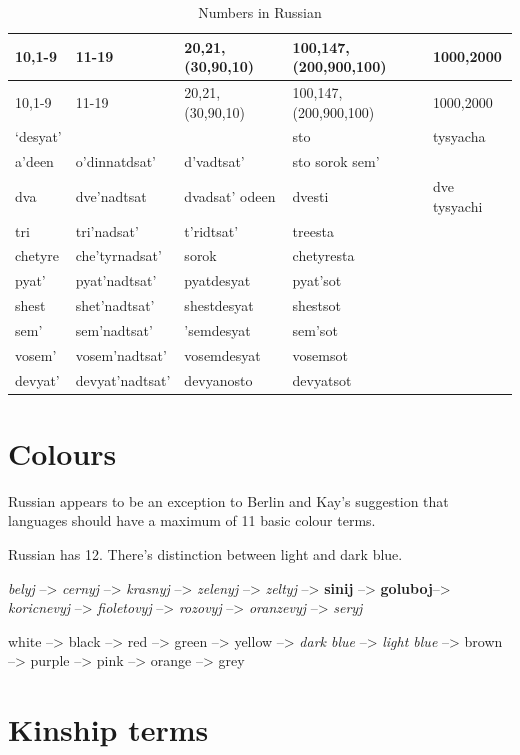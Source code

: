 \documentclass[
  a4paperpaper,
]{report}
\begin{document}
\begin{longtable}[]{@{}lllll@{}}
\caption{Numbers in Russian}\tabularnewline
\toprule
10,1-9 & 11-19 & 20,21,(30,90,10) & 100,147, (200,900,100) &
1000,2000\tabularnewline
\midrule
\endfirsthead
\toprule
10,1-9 & 11-19 & 20,21,(30,90,10) & 100,147, (200,900,100) &
1000,2000\tabularnewline
\midrule
\endhead
`desyat' & & & sto & tysyacha\tabularnewline
a'deen & o'dinnatdsat' & d'vadtsat' & sto sorok sem' &\tabularnewline
dva & dve'nadtsat & dvadsat' odeen & dvesti & dve
tysyachi\tabularnewline
tri & tri'nadsat' & t'ridtsat' & treesta &\tabularnewline
chetyre & che'tyrnadsat' & sorok & chetyresta &\tabularnewline
pyat' & pyat'nadtsat' & pyatdesyat & pyat'sot &\tabularnewline
shest & shet'nadtsat' & shestdesyat & shestsot &\tabularnewline
sem' & sem'nadtsat' & 'semdesyat & sem'sot &\tabularnewline
vosem' & vosem'nadtsat' & vosemdesyat & vosemsot &\tabularnewline
devyat' & devyat'nadtsat' & devyanosto & devyatsot &\tabularnewline
\bottomrule
\end{longtable}

\hypertarget{colours}{%
\section{Colours}\label{colours}}

Russian appears to be an exception to Berlin and Kay's suggestion that
languages should have a maximum of 11 basic colour terms.

Russian has 12. There's distinction between light and dark blue.

\emph{belyj} --\textgreater{} \emph{cernyj} --\textgreater{}
\emph{krasnyj} --\textgreater{} \emph{zelenyj} --\textgreater{}
\emph{zeltyj} --\textgreater{} \textbf{sinij} --\textgreater{}
\textbf{goluboj}--\textgreater{} \emph{koricnevyj} --\textgreater{}
\emph{fioletovyj} --\textgreater{} \emph{rozovyj} --\textgreater{}
\emph{oranzevyj} --\textgreater{} \emph{seryj}

white --\textgreater{} black --\textgreater{} red --\textgreater{} green
--\textgreater{} yellow --\textgreater{} \emph{dark blue}
--\textgreater{} \emph{light blue} --\textgreater{} brown
--\textgreater{} purple --\textgreater{} pink --\textgreater{} orange
--\textgreater{} grey

\hypertarget{kinship-terms}{%
\section{Kinship terms}\label{kinship-terms}}
\end{document}
